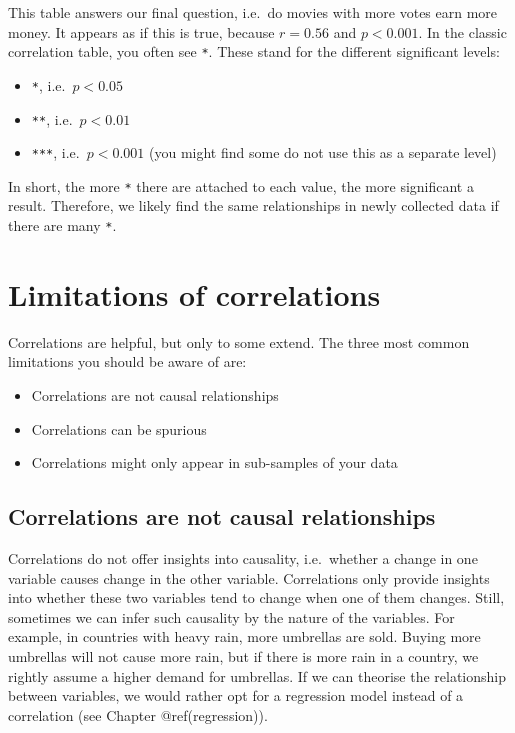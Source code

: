 \documentclass[
  letterpaper,
]{krantz}
\begin{document}
This table answers our final question, i.e.~do movies with more votes
earn more money. It appears as if this is true, because \(r = 0.56\) and
\(p < 0.001\). In the classic correlation table, you often see
\texttt{*}. These stand for the different significant levels:

\begin{itemize}
\item
  \texttt{*}, i.e.~\(p < 0.05\)
\item
  \texttt{**}, i.e.~\(p < 0.01\)
\item
  \texttt{***}, i.e.~\(p < 0.001\) (you might find some do not use this
  as a separate level)
\end{itemize}

In short, the more \texttt{*} there are attached to each value, the more
significant a result. Therefore, we likely find the same relationships
in newly collected data if there are many \texttt{*}.

\section{Limitations of
correlations}\label{sec-limitations-of-correlations}

Correlations are helpful, but only to some extend. The three most common
limitations you should be aware of are:

\begin{itemize}
\item
  Correlations are not causal relationships
\item
  Correlations can be spurious
\item
  Correlations might only appear in sub-samples of your data
\end{itemize}

\subsection{Correlations are not causal
relationships}\label{sec-correlations-are-not-causal-relationships}

Correlations do not offer insights into causality, i.e.~whether a change
in one variable causes change in the other variable. Correlations only
provide insights into whether these two variables tend to change when
one of them changes. Still, sometimes we can infer such causality by the
nature of the variables. For example, in countries with heavy rain, more
umbrellas are sold. Buying more umbrellas will not cause more rain, but
if there is more rain in a country, we rightly assume a higher demand
for umbrellas. If we can theorise the relationship between variables, we
would rather opt for a regression model instead of a correlation (see
Chapter @ref(regression)).
\end{document}
